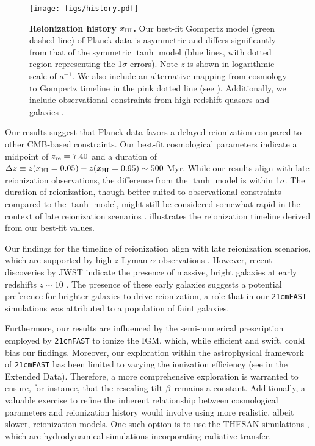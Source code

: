 \begin{figure}[tb]
\centering
\texttt{[image: figs/history.pdf]}
\caption{\textbf{Reionization history $x_{\mathrm{HI}}$.}
Our best-fit Gompertz model (green dashed line) of Planck data is
asymmetric and differs significantly from that of the symmetric $\tanh$
model (blue lines, with dotted region representing the 1$\sigma$
errors).
Note $z$ is shown in logarithmic scale of $a^{-1}$.
We also include an alternative mapping from cosmology to Gompertz
timeline in the pink dotted line (see ).
Additionally, we include observational constraints from high-redshift
quasars \cite{Greig2017, Banados2018, Davies2018, Greig2019, Wang2020,
Yang2020, Greig2022, Jin2023} and galaxies \cite{Ouchi2010,
Sobacchi2015, Mason2018, Mason2019, Hoag2019, Mesinger2015}.}
\label{fig:history}
\end{figure}

Our results suggest that Planck data favors a delayed reionization
compared to other CMB-based constraints.
Our best-fit cosmological parameters indicate a midpoint of $z_{\mathrm{re}} =
7.40$ and a duration of $\Delta z \equiv z(x_{\mathrm{HI}} = 0.05) - z(x_{\mathrm{HI}} =
0.95) \sim 500 $ Myr.
While our results align with late reionization observations, the
difference from the $\tanh$ model is within 1$\sigma$.
The duration of reionization, though better suited to observational
constraints compared to the $\tanh$ model, might still be considered
somewhat rapid in the context of late reionization scenarios
\cite{Cain2021}.
 illustrates the reionization timeline derived
from our best-fit values.

Our findings for the timeline of reionization align with late
reionization scenarios, which are supported by high-$z$ Lyman-$\alpha$
observations \cite{Keating2020, Cain2021}.
However, recent discoveries by JWST indicate the presence of massive,
bright galaxies at early redshifts $z \sim 10$
\cite{Adams2023, Bradley2023, Donnan2023}.
The presence of these early galaxies suggests a potential preference for
brighter galaxies to drive reionization, a role that in our
\texttt{21cmFAST} simulations was attributed to a population of faint
galaxies.

Furthermore, our results are influenced by the semi-numerical
prescription employed by \texttt{21cmFAST} to ionize the IGM, which,
while efficient and swift, could bias our findings.
Moreover, our exploration within the astrophysical framework of
\texttt{21cmFAST} has been limited to varying the ionization efficiency
(see  in the Extended Data).
Therefore, a more comprehensive exploration is warranted to ensure, for
instance, that the rescaling tilt $\beta$ remains a constant.
Additionally, a valuable exercise to refine the inherent relationship
between cosmological parameters and reionization history would involve
using more realistic, albeit slower, reionization models.
One such option is to use the THESAN simulations \cite{Kannan2022},
which are hydrodynamical simulations incorporating radiative transfer.



